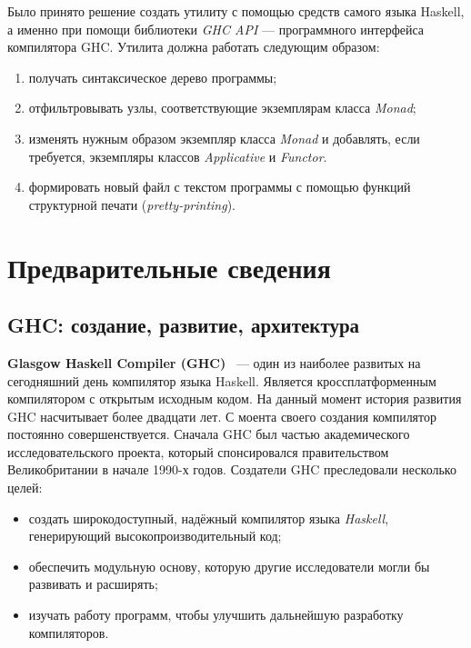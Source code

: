 Было принято решение создать утилиту с помощью средств самого языка Haskell, а именно при помощи библиотеки \textit{GHC API} --- программного интерфейса компилятора GHC. Утилита должна работать следующим образом:
\begin{enumerate}[1)]
\item получать синтаксическое дерево программы;
\item отфильтровывать узлы, соответствующие экземплярам класса \textit{Monad};
\item изменять нужным образом экземпляр класса \textit{Monad} и добавлять, если требуется, экземпляры классов \textit{Applicative} и \textit{Functor}.
\item формировать новый файл с текстом программы с помощью функций структурной печати (\textit{pretty-printing}).
\end{enumerate}


\section{Предварительные сведения}
\label{sec:prelim}

\subsection{GHC: создание, развитие, архитектура}
\textbf{Glasgow Haskell Compiler (GHC)} ~--- один из наиболее развитых на сегодняшний день компилятор языка Haskell. Является кроссплатформенным компилятором с открытым исходным кодом. На данный момент история развития GHC насчитывает более двадцати лет. С моента своего создания компилятор постоянно совершенствуется. Сначала GHC был частью академического исследовательского проекта, который спонсировался правительством Великобритании в начале 1990-х годов. Создатели GHC преследовали несколько целей:
\begin{itemize}
\item создать широкодоступный, надёжный компилятор языка \textit{Haskell}, генерирующий высокопроизводительный код;
\item обеспечить модульную основу, которую другие исследователи могли бы развивать и расширять;
\item изучать работу программ, чтобы улучшить дальнейшую разработку компиляторов.
\end{itemize}

